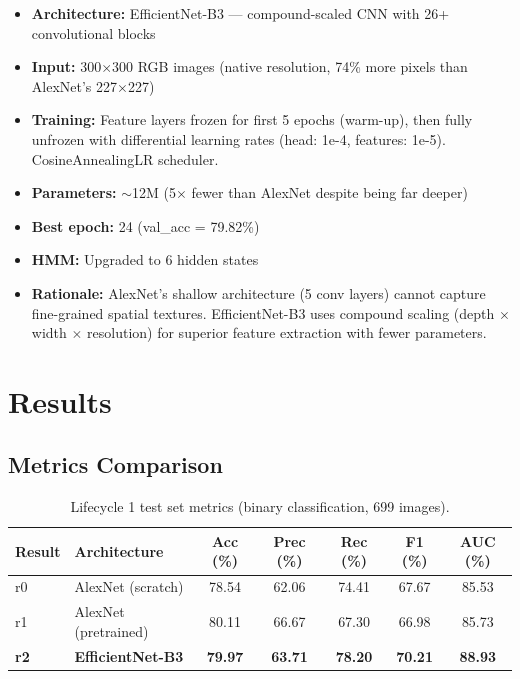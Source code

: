 \documentclass[11pt]{article}
\begin{document}
\begin{itemize}[noitemsep]
    \item \textbf{Architecture:} EfficientNet-B3 --- compound-scaled CNN with 26+ convolutional blocks
    \item \textbf{Input:} 300$\times$300 RGB images (native resolution, 74\% more pixels than AlexNet's 227$\times$227)
    \item \textbf{Training:} Feature layers frozen for first 5 epochs (warm-up), then fully unfrozen with differential learning rates (head: 1e-4, features: 1e-5). CosineAnnealingLR scheduler.
    \item \textbf{Parameters:} $\sim$12M (5$\times$ fewer than AlexNet despite being far deeper)
    \item \textbf{Best epoch:} 24 (val\_acc = 79.82\%)
    \item \textbf{HMM:} Upgraded to 6 hidden states
    \item \textbf{Rationale:} AlexNet's shallow architecture (5 conv layers) cannot capture fine-grained spatial textures. EfficientNet-B3 uses compound scaling (depth $\times$ width $\times$ resolution) for superior feature extraction with fewer parameters.
\end{itemize}

\section{Results}

\subsection{Metrics Comparison}

\begin{table}[H]
    \centering
    \renewcommand{\arraystretch}{1.2}
    \begin{tabular}{llccccc}
        \toprule
        \textbf{Result} & \textbf{Architecture} & \textbf{Acc (\%)} & \textbf{Prec (\%)} & \textbf{Rec (\%)} & \textbf{F1 (\%)} & \textbf{AUC (\%)} \\
        \midrule
        r0 & AlexNet (scratch) & 78.54 & 62.06 & 74.41 & 67.67 & 85.53 \\
        r1 & AlexNet (pretrained) & 80.11 & 66.67 & 67.30 & 66.98 & 85.73 \\
        \rowcolor{bestgreen}
        \textbf{r2} & \textbf{EfficientNet-B3} & \textbf{79.97} & \textbf{63.71} & \textbf{78.20} & \textbf{70.21} & \textbf{88.93} \\
        \bottomrule
    \end{tabular}
    \caption{Lifecycle 1 test set metrics (binary classification, 699 images).}
\end{table}
\end{document}

